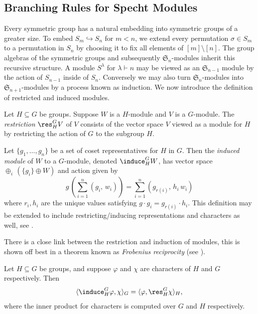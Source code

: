 \documentclass[11pt]{report}
\begin{document}
\subsection{Branching Rules for Specht Modules}
\label{chpt4:subsec:branching}

Every symmetric group has a natural embedding into symmetric groups of a greater size.	
To embed $S_{m} \hookrightarrow S_{n}$ for $m<n$, we extend every permutation $\sigma \in S_{m}$ to a permutation in $S_{n}$ by choosing it to fix all elements of $[m] \setminus [n]$. The group algebras of the symmetric groups and subsequently $\mathfrak{S}_{n}$-modules inherit this recursive structure. A module $S^{\lambda}$ for $\lambda\vdash n$ may be viewed as an $\mathfrak{S}_{n-1}$ module by the action of $S_{n-1}$ inside of $S_{n}$. Conversely we may also turn $\mathfrak{S}_{n}$-modules into $\mathfrak{S}_{n+1}$-modules by a process known as induction. We now introduce the definition of restricted and induced modules.

\begin{defn}
	\label{chpt4:def:restrictandinduce}
	Let $H \subseteq G$ be groups. Suppose $W$ is a $H$-module and $V$ is a $G$-module. The \emph{restriction} $\res_{H}^{G} V$ of $V$ consists of the vector space $V$ viewed as a module for $H$ by restricting the action of $G$ to the subgroup $H$.	
	
	
	
	Let $\{g_{1},\ldots, g_{n}\}$ be a set of coset representatives for $H$ in $G$. Then the \emph{induced module}  of $W$ to a $G$-module, denoted $\induce_{H}^{G}W$, has vector space $\oplus_{i} \, \left( \{g_{i} \} \oplus W\right)$ and action given by
	\[g \,\left( \sum_{i=1}^{n}(g_{i}, \, w_{i}) \right) = \sum_{i=1}^{n} (g_{r(i)}, \, h_{i} \, w_{i} ) \]
	where $r_{i}, h_{i}$ are the unique values satisfying $g \cdot g_{i} = g_{r(i)} \cdot h_{i}$. This definition may be extended to include restricting/inducing representations and characters as well, see \cite[Chapter 21]{james2001representations}.
\end{defn}

There is a close link between the restriction and induction of modules, this is shown off best in a theorem known as \emph{Frobenius reciprocity} (see  \cite[Theorem 21.16]{james2001representations}).

\begin{thm}
	Let $H\subseteq G$ be groups, and suppose $\varphi$ and $\chi$ are characters of $H$ and $G$ respectively. Then
	\[\langle\induce_{H}^{G}\varphi, \chi \rangle_{G} = \langle \varphi, \res_{H}^{G}\chi \rangle_{H},\]
	where the inner product for characters is computed over $G$ and $H$ respectively.
\end{thm}
\end{document}
